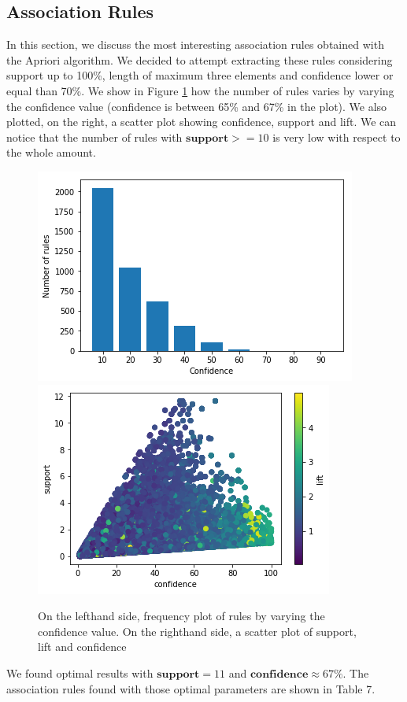 \documentclass{article}
\begin{document}
	
	\subsection{Association Rules}
	In this section, we discuss the most interesting association rules obtained with the Apriori algorithm. 
	We decided to attempt extracting these rules considering support up to 100\%, length of maximum three elements and confidence lower or equal than 70\%. We show in Figure \ref{fig:hyper_rf} how the number of rules varies by varying the confidence value (confidence is between 65\% and 67\% in the plot). We also plotted, on the right, a scatter plot showing confidence, support and lift. We can notice that the number of rules with $\mathbf{support} >= 10$ is very low with respect to the whole amount.
	
	
	\begin{figure}[]
		\centering
		\includegraphics[width=.43\textwidth]{rules.png}\hspace{1cm}
		\includegraphics[width=.4\textwidth]{AbusivismoEdilizio.png}
		\caption{On the lefthand side, frequency plot of rules by varying the confidence value. On the righthand side, a scatter plot of support, lift and confidence}
		\label{fig:hyper_rf}
	\end{figure}
	
	We found optimal results with $\mathbf{support} = 11$ and $\mathbf{confidence} \approx 67\%$.  
	The association rules found with those optimal parameters are shown in Table 7.
	
\end{document}
